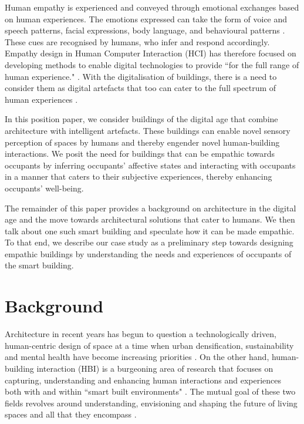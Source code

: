 \documentclass [sigconf] {acmart}
\begin{document}
Human empathy is experienced and conveyed through emotional exchanges based on human experiences. The emotions expressed can take the form of voice and speech patterns, facial expressions, body language, and behavioural patterns \cite{riess2017science}. These cues are recognised by humans, who infer and respond accordingly. Empathy design in Human Computer Interaction (HCI) has therefore focused on developing methods to enable digital technologies to provide ``for the full range of human experience." \cite{wright2008empathy}. With the digitalisation of buildings, there is a need to consider them as digital artefacts that too can cater to the full spectrum of human experiences \cite{derix2014empathic}. 

In this position paper, we consider buildings of the digital age that combine architecture with intelligent artefacts. These buildings can enable novel sensory perception of spaces by humans and thereby engender novel human-building interactions. We posit the need for buildings that can be empathic towards occupants by inferring occupants' affective states and interacting with occupants in a manner that caters to their subjective experiences, thereby enhancing occupants' well-being.


The remainder of this paper provides a background on architecture in the digital age and the move towards architectural solutions that cater to humans. We then talk about one such smart building and speculate how it can be made empathic. To that end, we describe our case study as a preliminary step towards designing empathic buildings by understanding the needs and experiences of occupants of the smart building. 


\section{Background}
Architecture in recent years has begun to question a technologically driven, human-centric design of space at a time when urban densification, sustainability and mental health have become increasing priorities \cite{derix2014empathic}. On the other hand, human-building interaction (HBI) is a burgeoning area of research that focuses on capturing, understanding and enhancing human interactions and experiences both with and within ``smart built environments" \cite{alavi2016future}. The mutual goal of these two fields revolves around understanding,  envisioning and shaping the future of living spaces and all that they encompass \cite{nembrini2017human, alavi2018artifacts}. 
\end{document}
